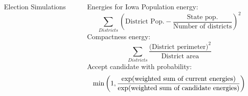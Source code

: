 \documentclass[leqno, handout]{beamer}
\theoremstyle{definition}
\begin{document}
\begin{frame}
\begin{columns}[t]
\begin{column}{.45\linewidth}
\begin{columns}[t]
\begin{column}[t]{.48\linewidth}
\begin{block}{Election Simulations}
\end{block}
\end{column}
\end{columns}


\end{column}




\begin{column}{.25\linewidth}

\begin{block}{Energies for Iowa}
Population energy:
\[\sum_{Districts}\left(\text{District Pop.}- \frac{\text{State pop.}}{\text{Number of districts}}\right)^2\]
Compactness energy:
\[\sum_{Districts}\frac{\text{(District perimeter)}^2}{\text{District area}}\]
Accept candidate with probability:
\[\text{min}\left(1,\frac{\textnormal{exp(weighted sum of current energies})}{\textnormal{exp(weighted sum of candidate energies})}\right)\]





\end{block}


\end{column}
\end{columns}
\end{frame}
\end{document}
